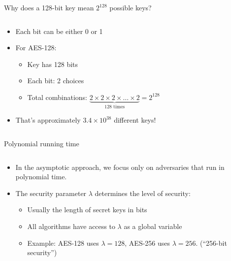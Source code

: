 \documentclass[aspectratio=169, lualatex, handout]{beamer}
\begin{document}
\begin{frame}{Why does a 128-bit key mean $2^{128}$ possible keys?}
	\begin{columns}[c]
		\begin{column}{1\textwidth}
			\begin{itemize}
				\item Each bit can be either 0 or 1
				\item For AES-128:
				      \begin{itemize}
					      \item Key has 128 bits
					      \item Each bit: 2 choices
					      \item Total combinations: $\underbrace{2 \times 2 \times 2 \times \ldots \times 2}_{128 \text{ times}} = 2^{128}$
				      \end{itemize}
				\item That's approximately $3.4 \times 10^{38}$ different keys!
			\end{itemize}
		\end{column}
	\end{columns}
\end{frame}

\begin{frame}{Polynomial running time}
	\begin{columns}[c]
		\begin{column}{0.5\textwidth}
			\begin{itemize}
				\item In the asymptotic approach, we focus only on adversaries that run in polynomial time.
				\item The security parameter $\lambda$ determines the level of security:
				      \begin{itemize}
					      \item Usually the length of secret keys in bits
					      \item All algorithms have access to $\lambda$ as a global variable
					      \item Example: AES-128 uses $\lambda = 128$, AES-256 uses $\lambda = 256$. (``256-bit security'')
				      \end{itemize}
			\end{itemize}
		\end{column}
		\begin{column}{0.5\textwidth}
		\end{column}
	\end{columns}
\end{frame}
\end{document}
